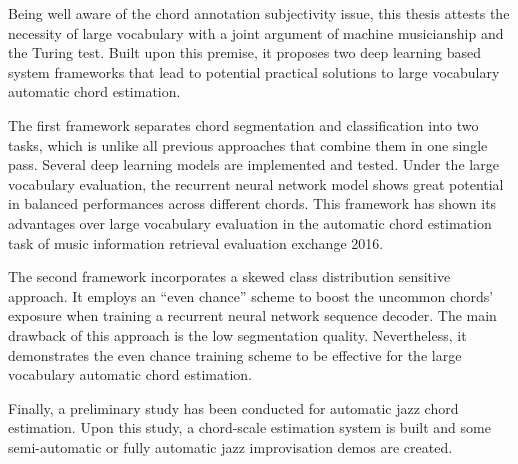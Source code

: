 Being well aware of the chord annotation subjectivity issue, this thesis attests the necessity of large vocabulary with a joint argument of machine musicianship and the Turing test. Built upon this premise, it proposes two deep learning based system frameworks that lead to potential practical solutions to large vocabulary automatic chord estimation.

The first framework separates chord segmentation and classification into two tasks, which is unlike all previous approaches that combine them in one single pass. Several deep learning models are implemented and tested. Under the large vocabulary evaluation, the recurrent neural network model shows great potential in balanced performances across different chords. This framework has shown its advantages over large vocabulary evaluation in the automatic chord estimation task of music information retrieval evaluation exchange 2016.

The second framework incorporates a skewed class distribution sensitive approach. It employs an ``even chance'' scheme to boost the uncommon chords' exposure when training a recurrent neural network sequence decoder. The main drawback of this approach is the low segmentation quality. Nevertheless, it demonstrates the even chance training scheme to be effective for the large vocabulary automatic chord estimation.

Finally, a preliminary study has been conducted for automatic jazz chord estimation. Upon this study, a chord-scale estimation system is built and some semi-automatic or fully automatic jazz improvisation demos are created.
